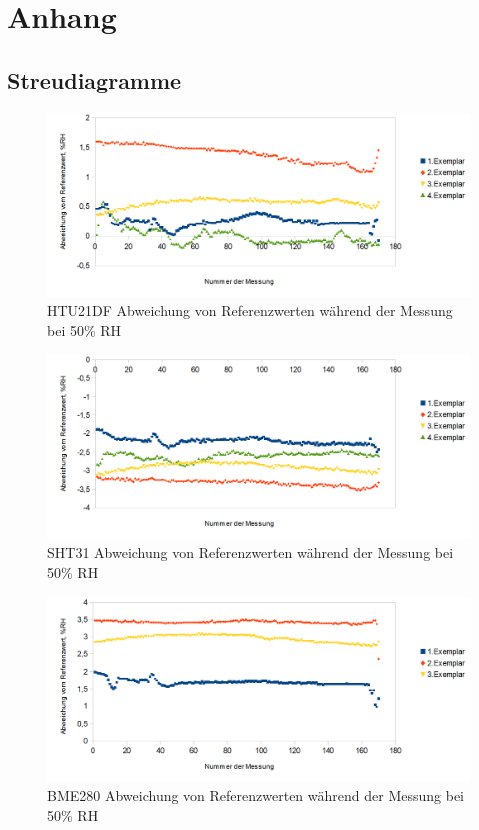 \documentclass[runningheads]{llncs}
\begin{document}
\appendix
\section{Anhang}
\subsection{Streudiagramme}

\begin{figure}[h]
\includegraphics[width=\textwidth]{pictures/HTU21D_50.png}
\caption{HTU21DF Abweichung von Referenzwerten während der Messung bei 50\% RH}
\end{figure}

\begin{figure}[h]
\includegraphics[width=\textwidth]{pictures/SHT31_50.png}
\caption{SHT31 Abweichung von Referenzwerten während der Messung bei 50\% RH}
\end{figure}


\begin{figure}[h]
\includegraphics[width=\textwidth]{pictures/BME280_50.png}
\caption{BME280 Abweichung von Referenzwerten während der Messung bei 50\% RH}
\end{figure}
\end{document}
